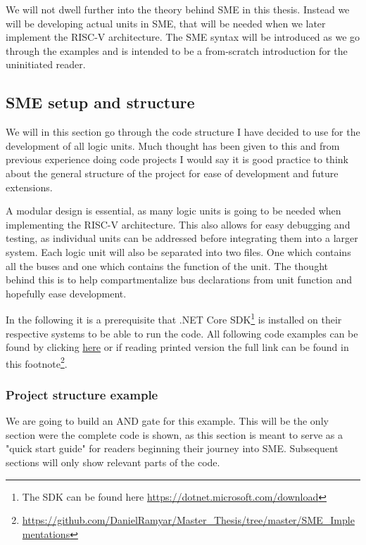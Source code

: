         We will not dwell further into the theory behind SME in this thesis. Instead we will be developing actual units in SME, that will be needed when we later implement the RISC-V architecture. The SME syntax will be introduced as we go through the examples and is intended to be a from-scratch introduction for the uninitiated reader. 

    \subsection{SME setup and structure}
        We will in this section go through the code structure I have decided to use for the development of all logic units. Much thought has been given to this and from previous experience doing code projects I would say it is good practice to think about the general structure of the project for ease of development and future extensions.
        
        A modular design is essential, as many logic units is going to be needed when implementing the RISC-V architecture. This also allows for easy debugging and testing, as individual units can be addressed before integrating them into a larger system. Each logic unit will also be separated into two files. One which contains all the buses and one which contains the function of the unit. The thought behind this is to help compartmentalize bus declarations from unit function and hopefully ease development.  
        
        In the following it is a prerequisite that .NET Core SDK\footnote{The SDK can be found here \url{https://dotnet.microsoft.com/download}} is installed on their respective systems to be able to run the code. All following code examples can be found by clicking \href{https://github.com/DanielRamyar/Master_Thesis/tree/master/SME_Implementations}{here} or if reading printed version the full link can be found in this footnote\footnote{\url{https://github.com/DanielRamyar/Master_Thesis/tree/master/SME_Implementations}}.
        
        \subsubsection{Project structure example}
        We are going to build an AND gate for this example. This will be the only section were the complete code is shown, as this section is meant to serve as a "quick start guide" for readers beginning their journey into SME. Subsequent sections will only show relevant parts of the code. 
        
